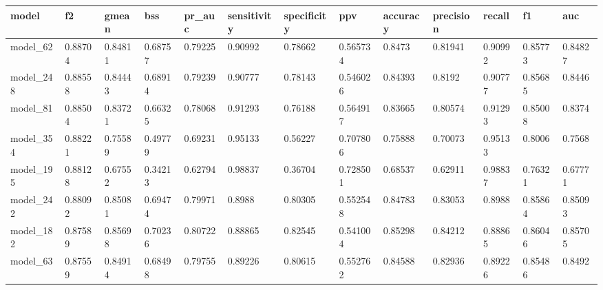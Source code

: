 \begin{tabular}{|l|l|l|l|l|l|l|l|l|l|l|l|l|}
\hline
\textbf{model} & \textbf{f2} & \textbf{gmean} & \textbf{bss} & \textbf{pr\_auc} & \textbf{sensitivity} & \textbf{specificity} & \textbf{ppv} & \textbf{accuracy} & \textbf{precision} & \textbf{recall} & \textbf{f1} & \textbf{auc} \\ \hline
model\_62      & 0.88704     & 0.84811        & 0.68757      & 0.79225          & 0.90992              & 0.78662              & 0.565734     & 0.8473            & 0.81941            & 0.90992         & 0.85773     & 0.84827      \\ \hline
model\_248     & 0.88558     & 0.84443        & 0.68914      & 0.79239          & 0.90777              & 0.78143              & 0.546026     & 0.84393           & 0.8192             & 0.90777         & 0.85685     & 0.8446       \\ \hline
model\_81      & 0.88504     & 0.83721        & 0.66325      & 0.78068          & 0.91293              & 0.76188              & 0.564917     & 0.83665           & 0.80574            & 0.91293         & 0.85008     & 0.8374       \\ \hline
model\_354     & 0.88221     & 0.75589        & 0.49779      & 0.69231          & 0.95133              & 0.56227              & 0.707806     & 0.75888           & 0.70073            & 0.95133         & 0.8006      & 0.7568       \\ \hline
model\_195     & 0.88128     & 0.67552        & 0.34213      & 0.62794          & 0.98837              & 0.36704              & 0.728501     & 0.68537           & 0.62911            & 0.98837         & 0.76321     & 0.67771      \\ \hline
model\_242     & 0.88092     & 0.85081        & 0.69474      & 0.79971          & 0.8988               & 0.80305              & 0.552548     & 0.84783           & 0.83053            & 0.8988          & 0.85864     & 0.85093      \\ \hline
model\_182     & 0.87589     & 0.85698        & 0.70236      & 0.80722          & 0.88865              & 0.82545              & 0.541004     & 0.85298           & 0.84212            & 0.88865         & 0.86046     & 0.85705      \\ \hline
model\_63      & 0.87559     & 0.84914        & 0.68498      & 0.79755          & 0.89226              & 0.80615              & 0.552762     & 0.84588           & 0.82936            & 0.89226         & 0.85486     & 0.8492       \\ \hline

\end{tabular}
